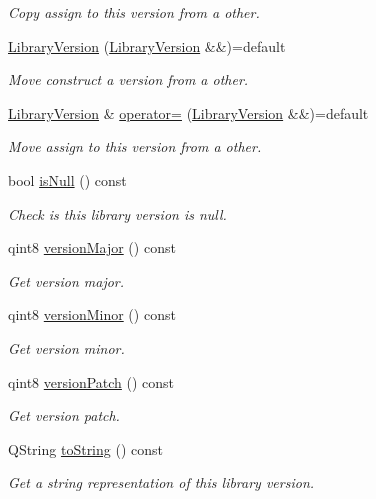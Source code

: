 \begin{DoxyCompactItemize}
\begin{DoxyCompactList}\small\item\em Copy assign to this version from a other. \end{DoxyCompactList}\item 
\hyperlink{class_mdt_1_1_deploy_utils_1_1_library_version_ac7a782eb42a7da0506c7d1a37f659b46}{Library\+Version} (\hyperlink{class_mdt_1_1_deploy_utils_1_1_library_version}{Library\+Version} \&\&)=default
\begin{DoxyCompactList}\small\item\em Move construct a version from a other. \end{DoxyCompactList}\item 
\hyperlink{class_mdt_1_1_deploy_utils_1_1_library_version}{Library\+Version} \& \hyperlink{class_mdt_1_1_deploy_utils_1_1_library_version_a225f6ffcbb1069fbc2d9d29327903568}{operator=} (\hyperlink{class_mdt_1_1_deploy_utils_1_1_library_version}{Library\+Version} \&\&)=default
\begin{DoxyCompactList}\small\item\em Move assign to this version from a other. \end{DoxyCompactList}\item 
bool \hyperlink{class_mdt_1_1_deploy_utils_1_1_library_version_a7e4ee196a0e36a20e968f169aeeb0a3f}{is\+Null} () const 
\begin{DoxyCompactList}\small\item\em Check is this library version is null. \end{DoxyCompactList}\item 
qint8 \hyperlink{class_mdt_1_1_deploy_utils_1_1_library_version_a12ad69de5e906500584d7c6f84c1f4b3}{version\+Major} () const 
\begin{DoxyCompactList}\small\item\em Get version major. \end{DoxyCompactList}\item 
qint8 \hyperlink{class_mdt_1_1_deploy_utils_1_1_library_version_a5974023e15b6810679f88ed1c0f8cd89}{version\+Minor} () const 
\begin{DoxyCompactList}\small\item\em Get version minor. \end{DoxyCompactList}\item 
qint8 \hyperlink{class_mdt_1_1_deploy_utils_1_1_library_version_a28dd254e9f168d136f8938d6f8860e08}{version\+Patch} () const 
\begin{DoxyCompactList}\small\item\em Get version patch. \end{DoxyCompactList}\item 
Q\+String \hyperlink{class_mdt_1_1_deploy_utils_1_1_library_version_a3fb89e24a243d660084fdd618d7c3054}{to\+String} () const 
\begin{DoxyCompactList}\small\item\em Get a string representation of this library version. \end{DoxyCompactList}\end{DoxyCompactItemize}


